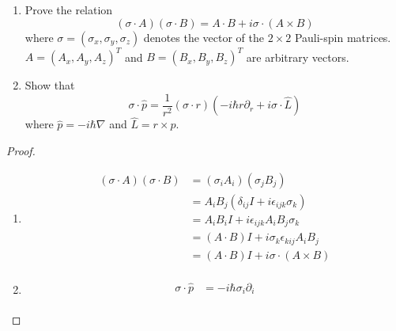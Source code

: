 \begin{Problem}

\begin{enumerate}[label=(\alph*)]
\item Prove the relation 
\[ (\sigma \cdot A)(\sigma \cdot B) = A \cdot B + i\sigma \cdot (A \times B)\]
where \( \sigma = (\sigma_x, \sigma_y, \sigma_z) \) denotes the vector of the \( 2 \times 2 \) Pauli-spin matrices. \( A = (A_x, A_y, A_z)^T \) and \( B = (B_x, B_y, B_z)^T \) are arbitrary vectors.

\item Show that 
\[ \sigma \cdot \hat{p} = \frac{1}{r^2}(\sigma \cdot r)\left(-i\hbar r\partial_r + i\sigma \cdot \hat{L}\right)\]
where \( \hat{p} = -i\hbar\nabla \) and \( \hat{L} = r \times \hat{p} \).
\end{enumerate}
\end{Problem}
\begin{proof}
\begin{enumerate}[label=(\alph*)]
	\item 
		\begin{align*}
			(\sigma \cdot A)(\sigma \cdot B) &= (\sigma_iA_i)(\sigma_jB_j)\\
							 &= A_i B_j(\delta_{ij}I+i\epsilon_{ijk}\sigma_k)\\
							 &= A_i B_i I +  i \epsilon_{ijk} A_i B_j \sigma_k\\
							 &= (A\cdot B)I + i \sigma_k\epsilon_{kij}A_i B_j \\
							 &= (A\cdot B)I + i \sigma\cdot (A\times B) \\
		\end{align*}
	\item 
		\begin{align*}
			\sigma\cdot \hat{p} &= -i \hbar \sigma_i \partial_i\\
		\end{align*}
\end{enumerate}
\end{proof}
